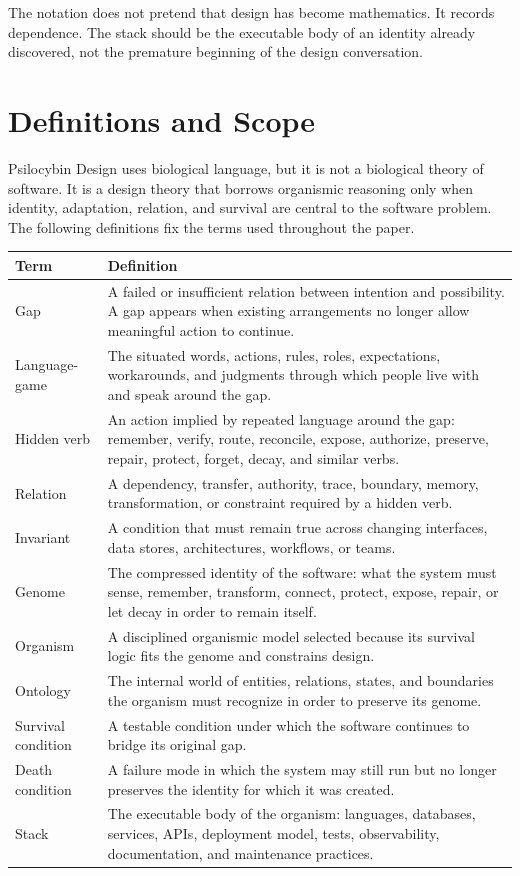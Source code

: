\documentclass[11pt]{article}
\begin{document}
The notation does not pretend that design has become mathematics. It records dependence. The stack should be the executable body of an identity already discovered, not the premature beginning of the design conversation.

\section{Definitions and Scope}

Psilocybin Design uses biological language, but it is not a biological theory of software. It is a design theory that borrows organismic reasoning only when identity, adaptation, relation, and survival are central to the software problem. The following definitions fix the terms used throughout the paper.

\begin{longtable}{|p{}|p{}|}
\hline
\textbf{Term} & \textbf{Definition} \\
\hline
Gap & A failed or insufficient relation between intention and possibility. A gap appears when existing arrangements no longer allow meaningful action to continue. \\
\hline
Language-game & The situated words, actions, rules, roles, expectations, workarounds, and judgments through which people live with and speak around the gap. \\
\hline
Hidden verb & An action implied by repeated language around the gap: remember, verify, route, reconcile, expose, authorize, preserve, repair, protect, forget, decay, and similar verbs. \\
\hline
Relation & A dependency, transfer, authority, trace, boundary, memory, transformation, or constraint required by a hidden verb. \\
\hline
Invariant & A condition that must remain true across changing interfaces, data stores, architectures, workflows, or teams. \\
\hline
Genome & The compressed identity of the software: what the system must sense, remember, transform, connect, protect, expose, repair, or let decay in order to remain itself. \\
\hline
Organism & A disciplined organismic model selected because its survival logic fits the genome and constrains design. \\
\hline
Ontology & The internal world of entities, relations, states, and boundaries the organism must recognize in order to preserve its genome. \\
\hline
Survival condition & A testable condition under which the software continues to bridge its original gap. \\
\hline
Death condition & A failure mode in which the system may still run but no longer preserves the identity for which it was created. \\
\hline
Stack & The executable body of the organism: languages, databases, services, APIs, deployment model, tests, observability, documentation, and maintenance practices. \\
\hline
\end{longtable}
\end{document}
